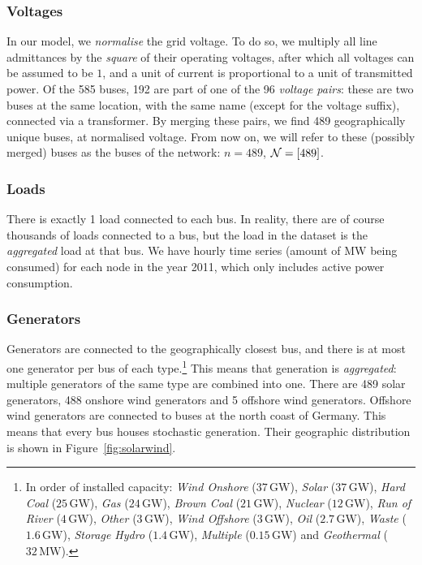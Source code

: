 \documentclass[main.tex]{subfiles}
\begin{document}
\subsubsection{Voltages}
In our model, we \emph{normalise} the grid voltage. To do so, we multiply all line admittances by the \emph{square} of their operating voltages, after which all voltages can be assumed to be $1$, and a unit of current is proportional to a unit of transmitted power. Of the 585 buses, 192 are part of one of the 96 \emph{voltage pairs}: these are two buses at the same location, with the same name (except for the voltage suffix), connected via a transformer. By merging these pairs, we find 489 geographically unique buses, at normalised voltage. From now on, we will refer to these (possibly merged) buses as the buses of the network: $n=489$, $\mathcal{N} = [489]$.

\subsubsection{Loads}
There is exactly 1 load connected to each bus. In reality, there are of course thousands of loads connected to a bus, but the load in the dataset is the \emph{aggregated} load at that bus. We have hourly time series (\ie amount of $\si{\mega\watt}$ being consumed) for each node in the year 2011, which only includes active power consumption.

\subsubsection{Generators}
Generators are connected to the geographically closest bus, and there is at most one generator per bus of each type.\footnote{In order of installed capacity: \emph{Wind Onshore} ($37\,\si{\giga\watt}$), \emph{Solar} ($37\,\si{\giga\watt}$), \emph{Hard Coal} ($25\,\si{\giga\watt}$), \emph{Gas} ($24\,\si{\giga\watt}$), \emph{Brown Coal} ($21\,\si{\giga\watt}$), \emph{Nuclear} ($12\,\si{\giga\watt}$), \emph{Run of River} ($4\,\si{\giga\watt}$), \emph{Other} ($3\,\si{\giga\watt}$), \emph{Wind Offshore} ($3\,\si{\giga\watt}$), \emph{Oil} ($2.7\,\si{\giga\watt}$), \emph{Waste} ($1.6\,\si{\giga\watt}$), \emph{Storage Hydro} ($1.4\,\si{\giga\watt}$), \emph{Multiple} ($0.15\,\si{\giga\watt}$) and \emph{Geothermal} ($32\,\si{\mega\watt}$).} This means that generation is \emph{aggregated}: multiple generators of the same type are combined into one. There are 489 solar generators, 488 onshore wind generators and 5 offshore wind generators. Offshore wind generators are connected to buses at the north coast of Germany. This means that every bus houses stochastic generation. Their geographic distribution is shown in Figure~\ref{fig:solarwind}.
\end{document}
